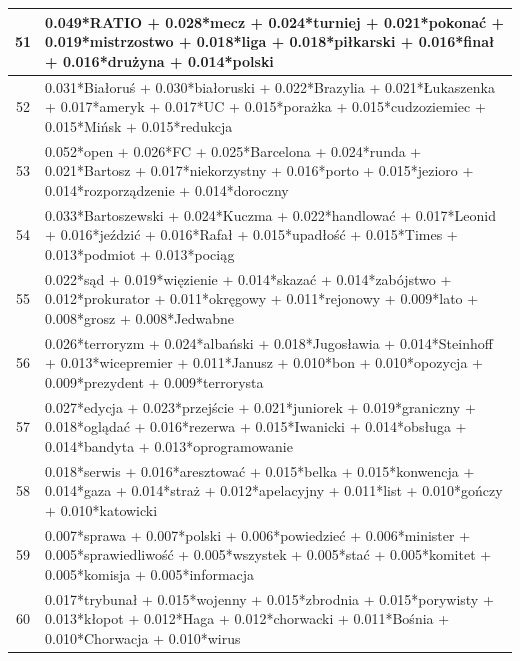 \documentclass[11pt,a4paper]{article}
\begin{document}
\begin{table}[h]
\begin{tabular}{|c|>{\footnotesize}p{\linewidth}|}
51 & 0.049*RATIO + 0.028*mecz + 0.024*turniej + 0.021*pokonać + 0.019*mistrzostwo + 0.018*liga + 0.018*piłkarski + 0.016*finał + 0.016*drużyna + 0.014*polski\\\hline
52 & 0.031*Białoruś + 0.030*białoruski + 0.022*Brazylia + 0.021*Łukaszenka + 0.017*ameryk + 0.017*UC + 0.015*porażka + 0.015*cudzoziemiec + 0.015*Mińsk + 0.015*redukcja\\\hline
53 & 0.052*open + 0.026*FC + 0.025*Barcelona + 0.024*runda + 0.021*Bartosz + 0.017*niekorzystny + 0.016*porto + 0.015*jezioro + 0.014*rozporządzenie + 0.014*doroczny\\\hline
54 & 0.033*Bartoszewski + 0.024*Kuczma + 0.022*handlować + 0.017*Leonid + 0.016*jeździć + 0.016*Rafał + 0.015*upadłość + 0.015*Times + 0.013*podmiot + 0.013*pociąg\\\hline
55 & 0.022*sąd + 0.019*więzienie + 0.014*skazać + 0.014*zabójstwo + 0.012*prokurator + 0.011*okręgowy + 0.011*rejonowy + 0.009*lato + 0.008*grosz + 0.008*Jedwabne\\\hline
56 & 0.026*terroryzm + 0.024*albański + 0.018*Jugosławia + 0.014*Steinhoff + 0.013*wicepremier + 0.011*Janusz + 0.010*bon + 0.010*opozycja + 0.009*prezydent + 0.009*terrorysta\\\hline
57 & 0.027*edycja + 0.023*przejście + 0.021*juniorek + 0.019*graniczny + 0.018*oglądać + 0.016*rezerwa + 0.015*Iwanicki + 0.014*obsługa + 0.014*bandyta + 0.013*oprogramowanie\\\hline
58 & 0.018*serwis + 0.016*aresztować + 0.015*belka + 0.015*konwencja + 0.014*gaza + 0.014*straż + 0.012*apelacyjny + 0.011*list + 0.010*gończy + 0.010*katowicki\\\hline
59 & 0.007*sprawa + 0.007*polski + 0.006*powiedzieć + 0.006*minister + 0.005*sprawiedliwość + 0.005*wszystek + 0.005*stać + 0.005*komitet + 0.005*komisja + 0.005*informacja\\\hline
60 & 0.017*trybunał + 0.015*wojenny + 0.015*zbrodnia + 0.015*porywisty + 0.013*kłopot + 0.012*Haga + 0.012*chorwacki + 0.011*Bośnia + 0.010*Chorwacja + 0.010*wirus\\\hline

\end{tabular}
\end{table}
\end{document}
